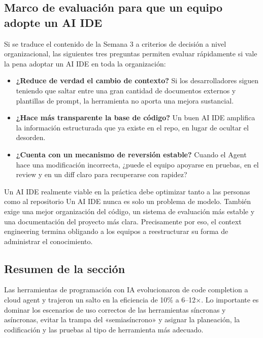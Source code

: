 \subsection{Marco de evaluación para que un equipo adopte un AI IDE}

Si se traduce el contenido de la Semana 3 a criterios de decisión a nivel organizacional, las siguientes tres preguntas permiten evaluar rápidamente si vale la pena adoptar un AI IDE en toda la organización:

\begin{itemize}
    \item \textbf{¿Reduce de verdad el cambio de contexto?} Si los desarrolladores siguen teniendo que saltar entre una gran cantidad de documentos externos y plantillas de prompt, la herramienta no aporta una mejora sustancial.
    \item \textbf{¿Hace más transparente la base de código?} Un buen AI IDE amplifica la información estructurada que ya existe en el repo, en lugar de ocultar el desorden.
    \item \textbf{¿Cuenta con un mecanismo de reversión estable?} Cuando el Agent hace una modificación incorrecta, ¿puede el equipo apoyarse en pruebas, en el review y en un diff claro para recuperarse con rapidez?
\end{itemize}

\begin{knowledgebox}{Un AI IDE realmente viable en la práctica debe optimizar tanto a las personas como al repositorio}
Un AI IDE nunca es solo un problema de modelo. También exige una mejor organización del código, un sistema de evaluación más estable y una documentación del proyecto más clara. Precisamente por eso, el context engineering termina obligando a los equipos a reestructurar su forma de administrar el conocimiento.
\end{knowledgebox}

\subsection{Resumen de la sección}

Las herramientas de programación con IA evolucionaron de code completion a cloud agent y trajeron un salto en la eficiencia de 10\% a 6--12$\times$. Lo importante es dominar los escenarios de uso correctos de las herramientas síncronas y asíncronas, evitar la trampa del «semiasíncrono» y asignar la planeación, la codificación y las pruebas al tipo de herramienta más adecuado.
